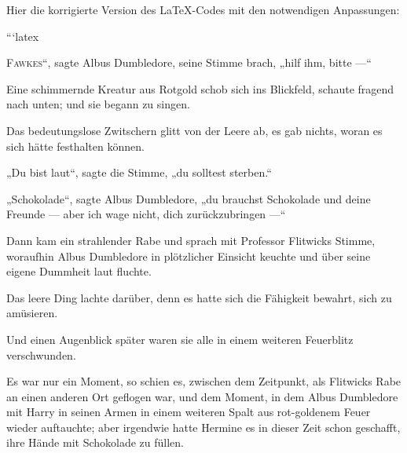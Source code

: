 Hier die korrigierte Version des LaTeX-Codes mit den notwendigen Anpassungen:

```latex

\lettrine[ante=„]{F}{awkes}“, sagte Albus Dumbledore, seine Stimme brach, „hilf ihm, bitte —“

Eine schimmernde Kreatur aus Rotgold schob sich ins Blickfeld, schaute fragend nach unten; und sie begann zu singen.

Das bedeutungslose Zwitschern glitt von der Leere ab, es gab nichts, woran es sich hätte festhalten können.

„Du bist laut“, sagte die Stimme, „du solltest sterben.“

„Schokolade“, sagte Albus Dumbledore, „du brauchst Schokolade und deine Freunde — aber ich wage nicht, dich zurückzubringen —“

Dann kam ein strahlender Rabe und sprach mit Professor Flitwicks Stimme, woraufhin Albus Dumbledore in plötzlicher Einsicht keuchte und über seine eigene Dummheit laut fluchte.

Das leere Ding lachte darüber, denn es hatte sich die Fähigkeit bewahrt, sich zu amüsieren.

Und einen Augenblick später waren sie alle in einem weiteren Feuerblitz verschwunden.

\later

Es war nur ein Moment, so schien es, zwischen dem Zeitpunkt, als Flitwicks Rabe an einen anderen Ort geflogen war, und dem Moment, in dem Albus Dumbledore mit Harry in seinen Armen in einem weiteren Spalt aus rot-goldenem Feuer wieder auftauchte; aber irgendwie hatte Hermine es in dieser Zeit schon geschafft, ihre Hände mit Schokolade zu füllen.

